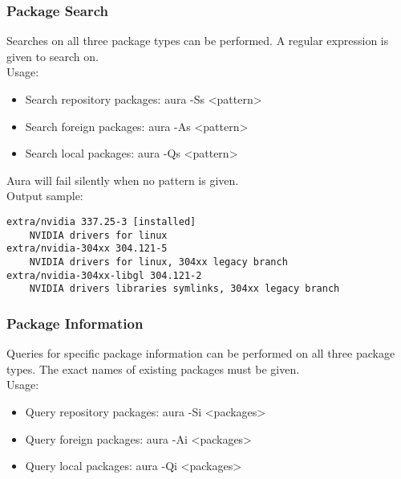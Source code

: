 \documentclass{article}
\begin{document}

\subsubsection{Package Search}
Searches on all three package types can be performed. A regular
expression is given to search on.\\
Usage:
\begin{itemize}
  \item Search repository packages: \colorbox{Apricot}{aura -Ss <pattern>}
  \item Search foreign packages: \colorbox{Apricot}{aura -As <pattern>}
  \item Search local packages: \colorbox{Apricot}{aura -Qs <pattern>}
\end{itemize}
Aura will fail silently when no pattern is given.\\
Output sample:
\begin{shaded}
\begin{verbatim}
extra/nvidia 337.25-3 [installed]
    NVIDIA drivers for linux
extra/nvidia-304xx 304.121-5
    NVIDIA drivers for linux, 304xx legacy branch
extra/nvidia-304xx-libgl 304.121-2
    NVIDIA drivers libraries symlinks, 304xx legacy branch
\end{verbatim}
\end{shaded}


\subsubsection{Package Information}
Queries for specific package information can be performed on all
three package types. The exact names of existing packages must be given.\\
Usage:
\begin{itemize}
  \item Query repository packages: \colorbox{Apricot}{aura -Si <packages>}
  \item Query foreign packages: \colorbox{Apricot}{aura -Ai <packages>}
  \item Query local packages: \colorbox{Apricot}{aura -Qi <packages>}
\end{itemize}

\end{document}
